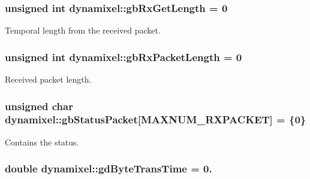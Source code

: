 \subsubsection[{gb\+Rx\+Get\+Length}]{\setlength{\rightskip}{0pt plus 5cm}unsigned int dynamixel\+::gb\+Rx\+Get\+Length = 0\hspace{0.3cm}{\ttfamily [private]}}\label{classdynamixel_a9d590ce24791d111c2db9b66be1e046d}


Temporal length from the received packet. 

\hypertarget{classdynamixel_a333686e1b5903d16c41df8172b6bd5a8}{}
\subsubsection[{gb\+Rx\+Packet\+Length}]{\setlength{\rightskip}{0pt plus 5cm}unsigned int dynamixel\+::gb\+Rx\+Packet\+Length = 0\hspace{0.3cm}{\ttfamily [private]}}\label{classdynamixel_a333686e1b5903d16c41df8172b6bd5a8}


Received packet length. 

\hypertarget{classdynamixel_aa57c86d3bbbeaf5c9d4f6bd00376b04f}{}
\subsubsection[{gb\+Status\+Packet}]{\setlength{\rightskip}{0pt plus 5cm}unsigned char dynamixel\+::gb\+Status\+Packet\mbox{[}{\bf M\+A\+X\+N\+U\+M\+\_\+\+R\+X\+P\+A\+C\+K\+E\+T}\mbox{]} = \{0\}\hspace{0.3cm}{\ttfamily [private]}}\label{classdynamixel_aa57c86d3bbbeaf5c9d4f6bd00376b04f}


Contains the status. 

\hypertarget{classdynamixel_a2173f25c6299da7ddb37ba3d2bf1f738}{}
\subsubsection[{gd\+Byte\+Trans\+Time}]{\setlength{\rightskip}{0pt plus 5cm}double dynamixel\+::gd\+Byte\+Trans\+Time = 0.\hspace{0.3cm}{\ttfamily [private]}}\label{classdynamixel_a2173f25c6299da7ddb37ba3d2bf1f738}


